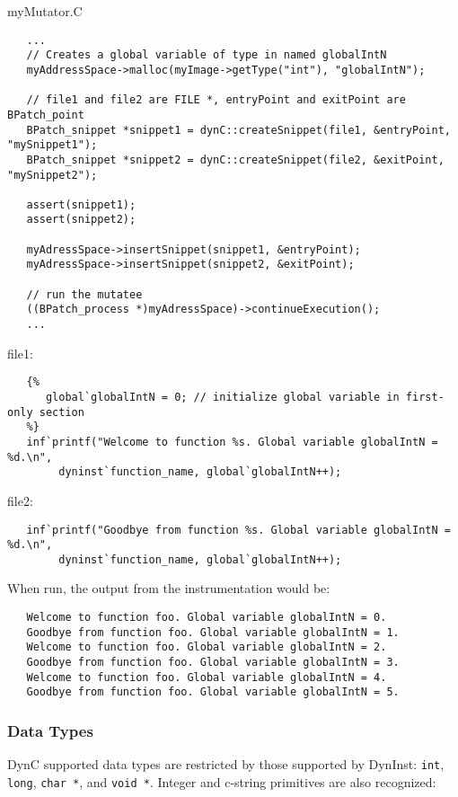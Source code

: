 \documentclass{article}
\begin{document}
\noindent myMutator.C
\begin{lstlisting}
   ...
   // Creates a global variable of type in named globalIntN
   myAddressSpace->malloc(myImage->getType("int"), "globalIntN"); 
   
   // file1 and file2 are FILE *, entryPoint and exitPoint are BPatch_point 
   BPatch_snippet *snippet1 = dynC::createSnippet(file1, &entryPoint, "mySnippet1"); 
   BPatch_snippet *snippet2 = dynC::createSnippet(file2, &exitPoint, "mySnippet2");
   
   assert(snippet1);
   assert(snippet2);
   
   myAdressSpace->insertSnippet(snippet1, &entryPoint);
   myAdressSpace->insertSnippet(snippet2, &exitPoint);
   
   // run the mutatee
   ((BPatch_process *)myAdressSpace)->continueExecution();
   ...
\end{lstlisting}
\noindent file1:
\begin{lstlisting}
   {%
      global`globalIntN = 0; // initialize global variable in first-only section
   %}
   inf`printf("Welcome to function %s. Global variable globalIntN = %d.\n", 
        dyninst`function_name, global`globalIntN++);
\end{lstlisting}

\noindent file2:
\begin{lstlisting}
   inf`printf("Goodbye from function %s. Global variable globalIntN = %d.\n", 
        dyninst`function_name, global`globalIntN++);
\end{lstlisting}

\noindent When run, the output from the instrumentation would be:
\begin{lstlisting}
   Welcome to function foo. Global variable globalIntN = 0.
   Goodbye from function foo. Global variable globalIntN = 1.
   Welcome to function foo. Global variable globalIntN = 2.
   Goodbye from function foo. Global variable globalIntN = 3.
   Welcome to function foo. Global variable globalIntN = 4.
   Goodbye from function foo. Global variable globalIntN = 5.
\end{lstlisting}

\subsubsection{Data Types}
DynC supported data types are restricted by those supported by DynInst: \verb!int!, \verb!long!, \verb!char *!, and \verb!void *!. Integer and c-string primitives are also recognized:\\
\end{document}
